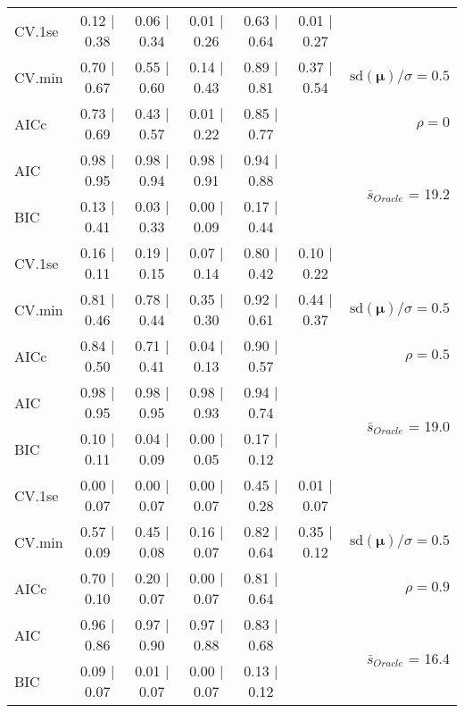 \begin{table}
\begin{center}
\begin{tabular}{l*{5}{c}|r}
 \hline 
CV.1se & 0.12 $\mid$ 0.38 & 0.06 $\mid$ 0.34 & 0.01 $\mid$ 0.26 & 0.63 $\mid$ 0.64 & 0.01 $\mid$ 0.27 & \\
CV.min & 0.70 $\mid$ 0.67 & 0.55 $\mid$ 0.60 & 0.14 $\mid$ 0.43 & 0.89 $\mid$ 0.81 & 0.37 $\mid$ 0.54 &  $\mathrm{sd}(\mathbf{\mu})/\sigma=0.5$ \\
AICc & 0.73 $\mid$ 0.69 & 0.43 $\mid$ 0.57 & 0.01 $\mid$ 0.22 & 0.85 $\mid$ 0.77 & & $\rho=0$ \\
AIC & 0.98 $\mid$ 0.95 & 0.98 $\mid$ 0.94 & 0.98 $\mid$ 0.91 & 0.94 $\mid$ 0.88 & &  \multirow{2}{*}{$\bar{s}_{Oracle}$ = 19.2} \\
BIC & 0.13 $\mid$ 0.41 & 0.03 $\mid$ 0.33 & 0.00 $\mid$ 0.09 & 0.17 $\mid$ 0.44 & &  \\
 \hline 
CV.1se & 0.16 $\mid$ 0.11 & 0.19 $\mid$ 0.15 & 0.07 $\mid$ 0.14 & 0.80 $\mid$ 0.42 & 0.10 $\mid$ 0.22 & \\
CV.min & 0.81 $\mid$ 0.46 & 0.78 $\mid$ 0.44 & 0.35 $\mid$ 0.30 & 0.92 $\mid$ 0.61 & 0.44 $\mid$ 0.37 &  $\mathrm{sd}(\mathbf{\mu})/\sigma=0.5$ \\
AICc & 0.84 $\mid$ 0.50 & 0.71 $\mid$ 0.41 & 0.04 $\mid$ 0.13 & 0.90 $\mid$ 0.57 & & $\rho=0.5$ \\
AIC & 0.98 $\mid$ 0.95 & 0.98 $\mid$ 0.95 & 0.98 $\mid$ 0.93 & 0.94 $\mid$ 0.74 & &  \multirow{2}{*}{$\bar{s}_{Oracle}$ = 19.0} \\
BIC & 0.10 $\mid$ 0.11 & 0.04 $\mid$ 0.09 & 0.00 $\mid$ 0.05 & 0.17 $\mid$ 0.12 & &  \\
 \hline 
CV.1se & 0.00 $\mid$ 0.07 & 0.00 $\mid$ 0.07 & 0.00 $\mid$ 0.07 & 0.45 $\mid$ 0.28 & 0.01 $\mid$ 0.07 & \\
CV.min & 0.57 $\mid$ 0.09 & 0.45 $\mid$ 0.08 & 0.16 $\mid$ 0.07 & 0.82 $\mid$ 0.64 & 0.35 $\mid$ 0.12 &  $\mathrm{sd}(\mathbf{\mu})/\sigma=0.5$ \\
AICc & 0.70 $\mid$ 0.10 & 0.20 $\mid$ 0.07 & 0.00 $\mid$ 0.07 & 0.81 $\mid$ 0.64 & & $\rho=0.9$ \\
AIC & 0.96 $\mid$ 0.86 & 0.97 $\mid$ 0.90 & 0.97 $\mid$ 0.88 & 0.83 $\mid$ 0.68 & &  \multirow{2}{*}{$\bar{s}_{Oracle}$ = 16.4} \\
BIC & 0.09 $\mid$ 0.07 & 0.01 $\mid$ 0.07 & 0.00 $\mid$ 0.07 & 0.13 $\mid$ 0.12 & &  \\
 \hline 
\end{tabular}
\end{center}
\vspace{-1cm}
\end{table}




